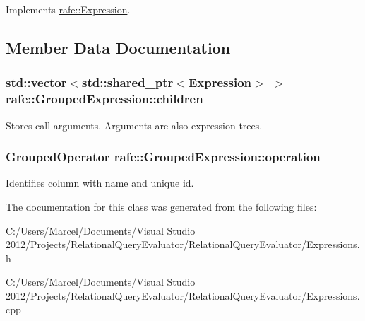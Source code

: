 Implements \hyperlink{classrafe_1_1_expression_a841879e8eb85f4bb68cfeec24231a701}{rafe\+::\+Expression}.



\subsection{Member Data Documentation}
\hypertarget{classrafe_1_1_grouped_expression_af31df501bd0d3e5ee9ce28ab4c71c4ee}{
\subsubsection[{children}]{\setlength{\rightskip}{0pt plus 5cm}std\+::vector$<$std\+::shared\+\_\+ptr$<${\bf Expression}$>$ $>$ rafe\+::\+Grouped\+Expression\+::children}}\label{classrafe_1_1_grouped_expression_af31df501bd0d3e5ee9ce28ab4c71c4ee}
Stores call arguments. Arguments are also expression trees. \hypertarget{classrafe_1_1_grouped_expression_a269644ee2565184c9386dd57d24e93bb}{
\subsubsection[{operation}]{\setlength{\rightskip}{0pt plus 5cm}Grouped\+Operator rafe\+::\+Grouped\+Expression\+::operation}}\label{classrafe_1_1_grouped_expression_a269644ee2565184c9386dd57d24e93bb}
Identifies column with name and unique id. 

The documentation for this class was generated from the following files\+:\begin{DoxyCompactItemize}
\item 
C\+:/\+Users/\+Marcel/\+Documents/\+Visual Studio 2012/\+Projects/\+Relational\+Query\+Evaluator/\+Relational\+Query\+Evaluator/Expressions.\+h\item 
C\+:/\+Users/\+Marcel/\+Documents/\+Visual Studio 2012/\+Projects/\+Relational\+Query\+Evaluator/\+Relational\+Query\+Evaluator/Expressions.\+cpp\end{DoxyCompactItemize}
